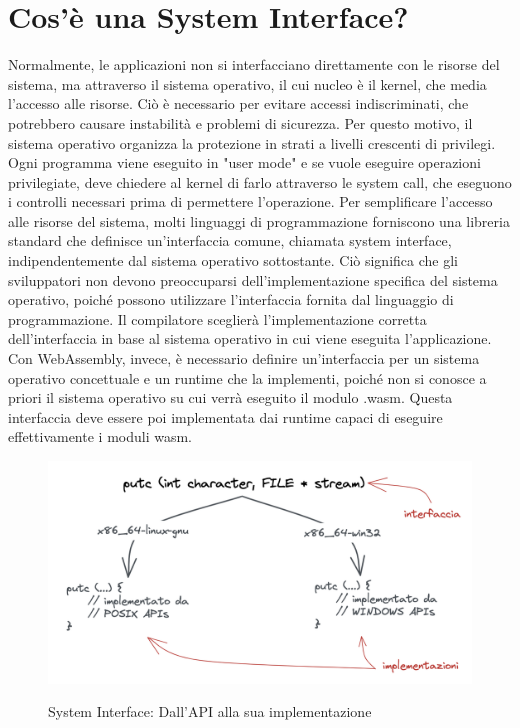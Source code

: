 \section{Cos'è una System Interface?}
Normalmente, le applicazioni non si interfacciano direttamente con le risorse del sistema, ma attraverso il sistema operativo, il cui nucleo è il kernel, che media l'accesso alle risorse. Ciò è necessario per evitare accessi indiscriminati, che potrebbero causare instabilità e problemi di sicurezza. Per questo motivo, il sistema operativo organizza la protezione in strati a livelli crescenti di privilegi. Ogni programma viene eseguito in "user mode" e se vuole eseguire operazioni privilegiate, deve chiedere al kernel di farlo attraverso le system call, che eseguono i controlli necessari prima di permettere l'operazione.
Per semplificare l'accesso alle risorse del sistema, molti linguaggi di programmazione forniscono una libreria standard che definisce un'interfaccia comune, chiamata system interface, indipendentemente dal sistema operativo sottostante. Ciò significa che gli sviluppatori non devono preoccuparsi dell'implementazione specifica del sistema operativo, poiché possono utilizzare l'interfaccia fornita dal linguaggio di programmazione. Il compilatore sceglierà l'implementazione corretta dell'interfaccia in base al sistema operativo in cui viene eseguita l'applicazione.
Con WebAssembly, invece, è necessario definire un'interfaccia per un sistema operativo concettuale e un runtime che la implementi, poiché non si conosce a priori il sistema operativo su cui verrà eseguito il modulo .wasm. Questa interfaccia deve essere poi implementata dai runtime capaci di eseguire effettivamente i moduli wasm.

\begin{figure}[h]
    \centering
    \captionsetup{justification=centering}
    \includegraphics[width=15cm]{./images/5.system-interface-api-to-impl.png}
    \label{system-interface-api-to-impl}
    \caption{System Interface: Dall'API alla sua implementazione}
\end{figure}

